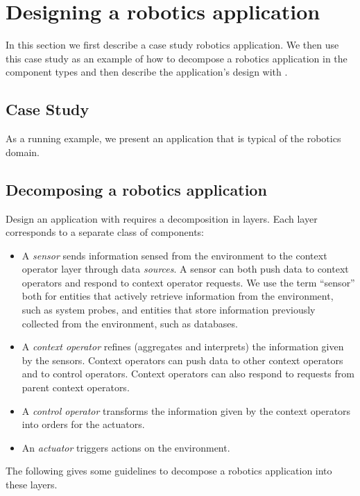 \section{Designing a robotics application}
\label{sec:designing}

In this section we first describe a case study robotics application.
We then use this case study as an example of how to decompose a
robotics application in the \diaspec{} component types and then
describe the application's design with \diaspec{}.

\subsection{Case Study}

As a running example, we present an application that is typical of the
robotics domain.

\subsection{Decomposing a robotics application}

Design an application with \diaspec{} requires a decomposition in
layers. Each layer corresponds to a separate class of components:

\begin{itemize}
\item A \emph{sensor} sends information sensed from the environment to
  the context operator layer through data \emph{sources}. A sensor can
  both push data to context operators and respond to context operator
  requests. We use the term ``sensor'' both for entities that actively
  retrieve information from the environment, such as system probes,
  and entities that store information previously collected from the
  environment, such as databases.
\item A \emph{context operator} refines (aggregates and interprets)
  the information given by the sensors. Context operators can push
  data to other context operators and to control operators. Context
  operators can also respond to requests from parent context
  operators.
\item A \emph{control operator} transforms the information given by
  the context operators into orders for the actuators.
\item An \emph{actuator} triggers actions on the environment.
\end{itemize}

The following gives some guidelines to decompose a robotics
application into these layers.

